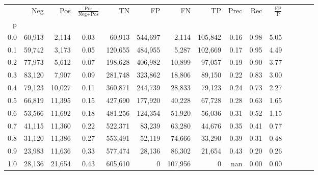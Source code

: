 \begin{tabular}{rrrcrrrrrrrrrrr}
\toprule
{} &     Neg &     Pos & $\frac{\text{Pos}}{\text{Neg}+\text{Pos}}$ &       TN &       FP &       FN &       TP &  Prec &   Rec & $\frac{\text{FP}}{\text{P}}$ \\
p   &         &         &                                            &          &          &          &          &       &       &                              \\
\midrule
0.0 &  60,913 &   2,114 &                                       0.03 &   60,913 &  544,697 &    2,114 &  105,842 &  0.16 &  0.98 &                         5.05 \\
0.1 &  59,742 &   3,173 &                                       0.05 &  120,655 &  484,955 &    5,287 &  102,669 &  0.17 &  0.95 &                         4.49 \\
0.2 &  77,973 &   5,612 &                                       0.07 &  198,628 &  406,982 &   10,899 &   97,057 &  0.19 &  0.90 &                         3.77 \\
0.3 &  83,120 &   7,907 &                                       0.09 &  281,748 &  323,862 &   18,806 &   89,150 &  0.22 &  0.83 &                         3.00 \\
0.4 &  79,123 &  10,027 &                                       0.11 &  360,871 &  244,739 &   28,833 &   79,123 &  0.24 &  0.73 &                         2.27 \\
0.5 &  66,819 &  11,395 &                                       0.15 &  427,690 &  177,920 &   40,228 &   67,728 &  0.28 &  0.63 &                         1.65 \\
0.6 &  53,566 &  11,692 &                                       0.18 &  481,256 &  124,354 &   51,920 &   56,036 &  0.31 &  0.52 &                         1.15 \\
0.7 &  41,115 &  11,360 &                                       0.22 &  522,371 &   83,239 &   63,280 &   44,676 &  0.35 &  0.41 &                         0.77 \\
0.8 &  31,120 &  11,386 &                                       0.27 &  553,491 &   52,119 &   74,666 &   33,290 &  0.39 &  0.31 &                         0.48 \\
0.9 &  23,983 &  11,636 &                                       0.33 &  577,474 &   28,136 &   86,302 &   21,654 &  0.43 &  0.20 &                         0.26 \\
1.0 &  28,136 &  21,654 &                                       0.43 &  605,610 &        0 &  107,956 &        0 &   nan &  0.00 &                         0.00 \\
\bottomrule
\end{tabular}
